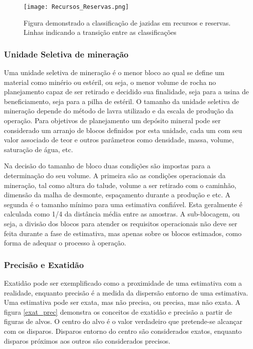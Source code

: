 \begin{figure}[H]
\centering
\texttt{[image: Recursos\_Reservas.png]}	
\caption{Figura demonstrado a classificação de jazidas em recursos e reservas. Linhas indicando a transição entre as classificações }
\label{Recursos_Reservas}
\end{figure}

\subsubsection{Unidade Seletiva de mineração}

Uma unidade seletiva de mineração é o menor bloco ao qual se define um material como minério ou estéril, ou seja, o menor volume de rocha no planejamento capaz de ser retirado e decidido sua finalidade, seja para a usina de beneficiamento, seja para a pilha de estéril. O tamanho da unidade seletiva de mineração depende do método de lavra utilizado e da escala de produção da operação. Para objetivos de planejamento um depósito mineral pode ser considerado um arranjo de blocos definidos por esta unidade, cada um com seu valor associado de teor e outros parâmetros como densidade, massa, volume, saturação de água, etc. 

Na decisão do tamanho de bloco duas condições são impostas para a determinação do seu volume. A primeira são as condições operacionais da mineração, tal como altura do talude, volume a ser retirado com o caminhão, dimensão da malha de desmonte, espaçamento durante a produção e etc. A segunda é o tamanho mínimo para uma estimativa confiável. Esta geralmente é calculada como 1/4 da distância média entre as amostras. A sub-blocagem, ou seja, a divisão dos blocos para atender os requisitos operacionais não deve ser feita durante a fase de estimativa, mas apenas sobre os blocos estimados, como forma de adequar o processo à operação. 

\subsubsection{Precisão e Exatidão}

Exatidão pode ser exemplificado como a proximidade de uma estimativa com a realidade, enquanto precisão é a medida da dispersão entorno de uma estimativa. Uma estimativa pode ser exata, mas não precisa, ou precisa, mas não exata. A figura \eqref{exat_prec} demonstra os conceitos de exatidão e precisão a partir de figuras de alvos. O centro do alvo é o valor verdadeiro que pretende-se alcançar com os disparos. Disparos entorno do centro são considerados exatos, enquanto disparos próximos aos outros são considerados precisos. 

